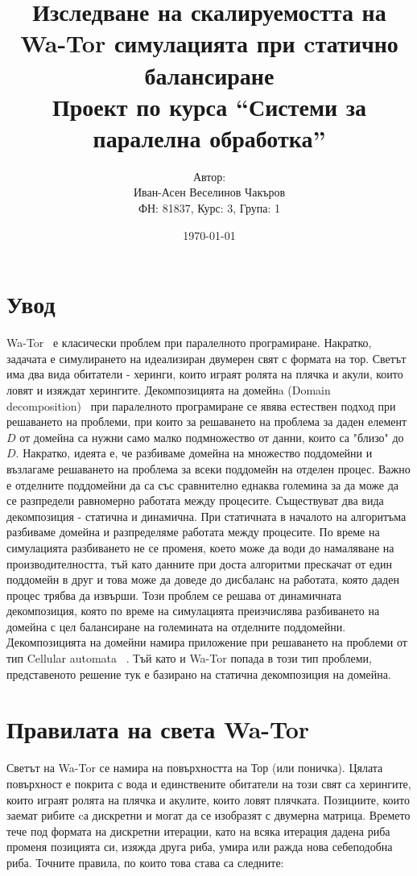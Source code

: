 \documentclass[12pt]{article}
\title{Изследване на скалируемостта на Wa-Tor симулацията при cтатично балансиране \\
	\large{Проект по курса ``Системи за паралелна обработка''}}
\author{Автор:\\ Иван-Асен Веселинов Чакъров \\
	ФН: 81837, Курс: 3, Група: 1}
\date{\today}
\begin{document}
\maketitle

\newpage

\tableofcontents

\newpage

\section{Увод}
Wa-Tor~\cite{wator} е класически проблем при паралелното програмиране.
Накратко, задачата е симулирането на идеализиран двумерен свят с формата на тор.
Светът има два вида обитатели - херинги, които играят ролята на плячка и акули, които ловят и изяждат херингите.
\bigbreak
Декомпозицията на домейнa (Domain decomposition)~\cite{domain_decomposition}
при паралелното програмиране се явява естествен подход при решаването на проблеми,
при които за решаването на проблема за даден елемент $D$ от домейна са нужни само малко подмножество от данни,
които са "близо" до $D$. Накратко, идеята е, че разбиваме домейна на множество поддомейни
и възлагаме решаването на проблема за всеки поддомейн на отделен процес.
Важно е отделните поддомейни да са със сравнително еднаква големина за да може да се разпредели
равномерно работата между процесите. Съществуват два вида декомпозиция - статична и динамична.
При статичната в началото на алгоритъма разбиваме домейна и разпределяме работата между процесите.
По време на симулацията разбиването не се променя, което може да води до намаляване на производителността,
тъй като данните при доста алгоритми прескачат от един поддомейн в друг и това може да доведе до дисбаланс
на работата, която даден процес трябва да извърши. Този проблем се решава от динамичната декомпозиция, която по време на симулацията
преизчислява разбиването на домейна с цел балансиране на големината на отделните поддомейни.
Декомпозицията на домейни намира приложение при решаването на проблеми от тип Cellular automata ~\cite{cellular_automata}.
\bigbreak
Тъй като и Wa-Tor попада в този тип проблеми, представеното решение тук е базирано
на статична декомпозиция на домейна.

\newpage
\section{Правилата на света Wa-Tor}

Светът на Wa-Tor се намира на повърхността на Тор (или поничка).
Цялата повърхност е покрита с вода и единствените обитатели на този свят са
херингите, които играят ролята на плячка и акулите, които ловят плячката.
Позициите, които заемат рибите cа дискретни и могат да се изобразят с
двумерна матрица. Времето тече под формата на дискретни итерации, като на всяка
итерация дадена риба променя позицията си, изяжда друга риба, умира или ражда
нова себеподобна риба. Точните правила, по които това става са следните:
\end{document}
